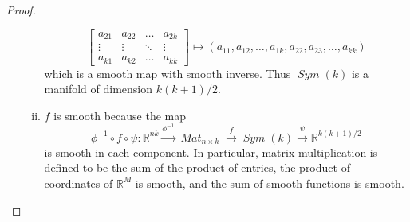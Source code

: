 \documentclass{article}
\begin{document}
\begin{proof}
\begin{enumerate}[(a)]
\begin{enumerate}[(i)]
\[\begin{bmatrix}
              a_{21} & a_{22} & \dots  & a_{2k} \\
              \vdots & \vdots & \ddots & \vdots \\
              a_{k1} & a_{k2} & \dots  & a_{kk}
            \end{bmatrix}
            \mapsto (a_{11}, a_{12}, \hdots, a_{1k}, a_{22}, a_{23},\hdots, a_{kk})
          \] which is a smooth map with smooth inverse.
          Thus $\operatorname{\mathit{Sym}}(k)$ is a manifold of dimension
          $k(k+1)/2$.
        \item $f$ is smooth because the map \[
          \phi^{-1} \circ f \circ \psi\colon \mathbb{R}^{nk}
            \xrightarrow{\phi^{-1}} \operatorname{\mathit{Mat}}_{n \times k}
            \xrightarrow{f} \operatorname{\mathit{Sym}}(k)
            \xrightarrow{\psi} \mathbb{R}^{k(k+1)/2}
        \] is smooth in each component. In particular, matrix multiplication is
        defined to be the sum of the product of entries, the product of
        coordinates of $\mathbb{R}^M$ is smooth, and the sum of smooth
        functions is smooth.
      \end{enumerate}


\end{enumerate}
\end{proof}
\end{document}
